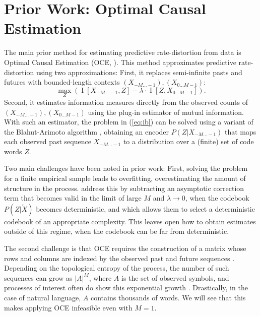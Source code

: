 \documentclass[entropy,article,submit,moreauthors,pdftex,10pt,a4paper]{Definitions/mdpi}
\newif \ifcomment
\newcommand\rljf[1]{\ifcomment{{\color{blue}(#1)}}\else{}\fi}
\newcommand{\past}{\overleftarrow{X}}
\newcommand{\finitefuture}{X_{0\dots M-1}}
\begin{document}



\section{Prior Work: Optimal Causal Estimation}\label{sec:oce}

The main prior method for estimating predictive rate-distortion from data is Optimal Causal Estimation (OCE, \citet{still-optimal-2010}).
This method approximates predictive rate-distortion using two approximations:
First, it replaces semi-infinite pasts and futures with bounded-length contexts $(X_{-M \dots -1}), (X_{0 \dots M-1})$:
\begin{equation}\label{eq:ib-oce}
	\max_{Z} \left( \operatorname{I}[X_{-M\dots -1}, Z] - \lambda \cdot \operatorname{I}[Z, \finitefuture] \right).
\end{equation}
Second, it estimates information measures directly from the observed counts of $(X_{-M\dots -1}), (\finitefuture)$ using the plug-in estimator of mutual information. %
With such an estimator, the problem in (\ref{eq:ib}) can be solved using a variant of the Blahut-Arimoto algorithm \citep{tishby-information-1999}, obtaining an encoder $P(Z|X_{-M \dots -1})$ that maps each observed past sequence $X_{-M...-1}$ to a distribution over a (finite) set of code words $Z$.

Two main challenges have been noted in prior work:
First, solving the problem for a finite empirical sample leads to overfitting, overestimating the amount of structure in the process.
\citet{still-optimal-2010} address this by subtracting an asymptotic correction term that becomes valid in the limit of large $M$ and $\lambda \rightarrow 0$, when the codebook $P(Z|\past)$ becomes deterministic, and which allows them to select a deterministic codebook of an appropriate complexity.
This leaves open how to obtain estimates outside of this regime, when the codebook can be far from deterministic.

The second challenge is that OCE requires the construction of a matrix whose rows and columns are indexed by the observed past and future sequences \citep{marzen-predictive-2016}.
Depending on the topological entropy of the process, the number of such sequences can grow as $|A|^M$, where $A$ is the set of observed symbols, and processes of interest often do show this exponential growth \citep{marzen-predictive-2016}.
Drastically, in the case of natural language, $A$ contains thousands of words.
We will see that this makes applying OCE infeasible even with $M=1$.
\end{document}
